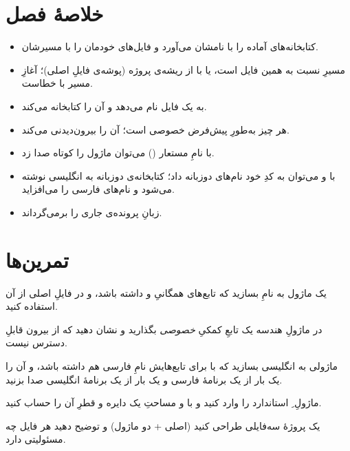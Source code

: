 \section{خلاصهٔ فصل}

\begin{itemize}
  \item {} کتابخانه‌های آماده را با نامشان می‌آورد و
         فایل‌های خودمان را با مسیرشان.
  \item مسیرِ  نسبت به همین فایل است، یا با  از ریشه‌ی
        پروژه (پوشه‌ی فایلِ اصلی)؛ آغازِ مسیر با  خطاست.
  \item {} به یک فایل نام می‌دهد و آن را کتابخانه می‌کند.
  \item هر چیز به‌طورِ پیش‌فرض خصوصی است؛  آن را بیرون‌دیدنی
        می‌کند.
  \item با نامِ مستعار () می‌توان ماژول را کوتاه صدا
        زد.
  \item با  و  می‌توان به کدِ خود نام‌های دوزبانه داد؛
        کتابخانه‌ی دوزبانه به انگلیسی نوشته می‌شود و  نام‌های فارسی را
        می‌افزاید.
  \item {} زبانِ پرونده‌ی جاری را برمی‌گرداند.
\end{itemize}

\section{تمرین‌ها}

\exercise یک ماژول به نامِ  بسازید که تابع‌های همگانیِ 
و  داشته باشد، و در فایلِ اصلی از آن استفاده کنید.

\exercise در ماژولِ هندسه یک تابعِ کمکیِ \emph{خصوصی} بگذارید و نشان دهید که از
بیرون قابلِ دسترس نیست.

\exercise ماژولی به انگلیسی بسازید که با  برای تابع‌هایش نامِ فارسی هم
داشته باشد، و آن را یک بار از یک برنامهٔ فارسی و یک بار از یک برنامهٔ انگلیسی صدا
بزنید.

\exercise ماژولِ ِ استاندارد را وارد کنید و با  و
 مساحتِ یک دایره و قطرِ آن را حساب کنید.

\exercise یک پروژهٔ سه‌فایلی طراحی کنید (اصلی + دو ماژول) و توضیح دهید هر فایل
چه مسئولیتی دارد.
